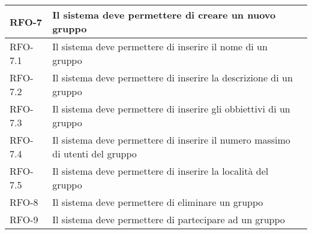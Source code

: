 \begin{center}
{\begin{longtable}{
      |>{\centering\arraybackslash}p{60pt}
      |>{\centering\arraybackslash}p{220pt}
      |>{\centering\arraybackslash}p{60pt}|}
      RFO-7                                                                & Il sistema deve permettere di creare un nuovo gruppo        &
      \nameref{uc:scenario-creazione-nuovo-gruppo}                                                                                         \\
      \hline

      RFO-7.1                                                              & Il sistema deve permettere di inserire il nome di un
      gruppo                                                               & \nameref{sub:inserimento-nome-gruppo}                         \\
      \hline

      RFO-7.2                                                              & Il sistema deve permettere di inserire la descrizione di
      un gruppo                                                            & \nameref{sub:inserimento-descrizione-gruppo}                  \\
      \hline

      RFO-7.3                                                              & Il sistema deve permettere di inserire gli obbiettivi di
      un gruppo                                                            & \nameref{sub:inserimento-obbiettivi-gruppo}                   \\
      \hline

      RFO-7.4                                                              & Il sistema deve permettere di inserire il numero massimo
      di utenti del gruppo                                                 & \nameref{sub:inserimento-numero-utenti-gruppo}                \\
      \hline

      RFO-7.5                                                              & Il sistema deve permettere di inserire la località del
      gruppo                                                               & \nameref{sub:inserimento-località-gruppo}                     \\
      \hline

      RFO-8                                                                & Il sistema deve permettere di eliminare un gruppo           &
      \nameref{uc:scenario-elimina-gruppo}                                                                                                 \\
      \hline

      RFO-9                                                                & Il sistema deve permettere di partecipare ad un gruppo      &
      \nameref{uc:scenario-partecipa-gruppo}                                                                                               \\
      \hline


\end{longtable}}
\end{center}
